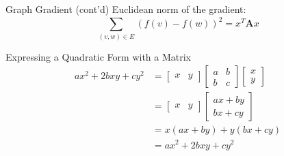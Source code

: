 \documentclass{beamer}
\begin{document}
\begin{frame}{Graph Gradient (cont'd)}
  Euclidean norm of the gradient:
  \[
  \sum _{ (v,w)\in E }^{  }{ { (f(v)-f(w)) }^{ 2 } } = { x }^{ T }\boldsymbol{A}x
  \]
  \begin{block}{Expressing a Quadratic Form with a Matrix}
    \begin{align*}
      ax^2 + 2bxy + cy^2 &= \begin{bmatrix} x & y \end{bmatrix}\begin{bmatrix} a & b \\ b & c \end{bmatrix}\begin{bmatrix} x \\ y \end{bmatrix} \\
      &= \begin{bmatrix} x & y \end{bmatrix} \begin{bmatrix} ax+by \\ bx+cy \end{bmatrix} \\
      &= x\left(ax+by\right) + y\left(bx+cy\right) \\
      &= ax^2 + 2bxy + cy^2
    \end{align*}
  \end{block}
\end{frame}
\end{document}
